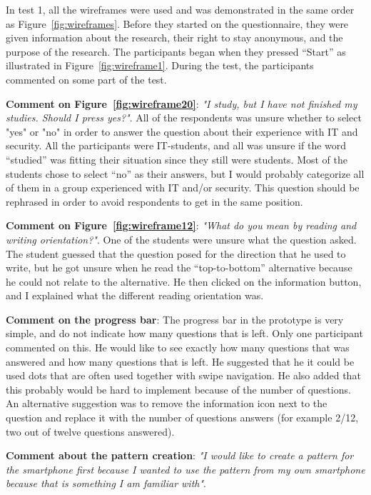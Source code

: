   In test 1, all the wireframes were used and was demonstrated in the same order as Figure~\ref{fig:wireframes}. Before they started on the questionnaire, they were given information about the research, their right to stay anonymous, and the purpose of the research. The participants began when they pressed ``Start'' as illustrated in Figure~\ref{fig:wireframe1}. During the test, the participants commented on some part of the test.

  {\bf Comment on Figure~\ref{fig:wireframe20}}: {\it "I study, but I have not finished my studies. Should I press yes?"}. All of the respondents was unsure whether to select "yes" or "no" in order to answer the question about their experience with IT and security. All the participants were IT-students, and all was unsure if the word ``studied'' was fitting their situation since they still were students. Most of the students chose to select ``no'' as their answers, but I would probably categorize all of them in a group experienced with IT and/or security. This question should be rephrased in order to avoid respondents to get in the same position.

  {\bf Comment on Figure~\ref{fig:wireframe12}}: {\it "What do you mean by reading and writing orientation?"}. One of the students were unsure what the question asked. The student guessed that the question posed for the direction that he used to write, but he got unsure when he read the ``top-to-bottom'' alternative because he could not relate to the alternative. He then clicked on the information button, and I explained what the different reading orientation was.

  {\bf Comment on the progress bar}: The progress bar in the prototype is very simple, and do not indicate how many questions that is left. Only one participant commented on this. He would like to see exactly how many questions that was answered and how many questions that is left. He suggested that he it could be used dots that are often used together with swipe navigation. He also added that this probably would be hard to implement because of the number of questions. An alternative suggestion was to remove the information icon next to the question and replace it with the number of questions answers (for example 2/12, two out of twelve questions answered).

  {\bf Comment about the pattern creation}: {\it "I would like to create a pattern for the smartphone first because I wanted to use the pattern from my own smartphone because that is something I am familiar with"}.

